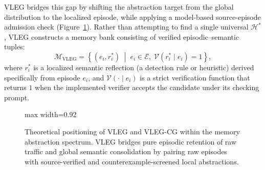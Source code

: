 \documentclass[10pt,a4paper,onecolumn]{article}
\theoremstyle{definition}
\theoremstyle{remark}
\begin{document}
VLEG bridges this gap by shifting the abstraction target from the global distribution to the localized episode, while applying a model-based source-episode admission check (Figure~\ref{fig:vleg_spectrum}). Rather than attempting to find a single universal $\mathcal{H}^*$, VLEG constructs a memory bank consisting of verified episodic--semantic tuples:
\begin{equation}
    \mathcal{M}_{\mathrm{VLEG}} = \left\{ (e_i, r_i^*) \;\middle|\; e_i \in \mathcal{E}, \; \mathcal{V}(r_i^* \mid e_i) = 1 \right\},
    \label{eq:vleg_bank}
\end{equation}
where $r_i^*$ is a localized semantic reflection (a detection rule or heuristic) derived specifically from episode $e_i$, and $\mathcal{V}(\cdot \mid e_i)$ is a strict verification function that returns $1$ when the implemented verifier accepts the candidate under its checking prompt.

\begin{figure}[!t]
\centering
\begin{adjustbox}{max width=0.92\linewidth}\end{adjustbox}
\caption{Theoretical positioning of VLEG and VLEG-CG within the memory abstraction spectrum. VLEG bridges pure episodic retention of raw traffic and global semantic consolidation by pairing raw episodes with source-verified and counterexample-screened local abstractions.}
\label{fig:vleg_spectrum}
\end{figure}
\end{document}
